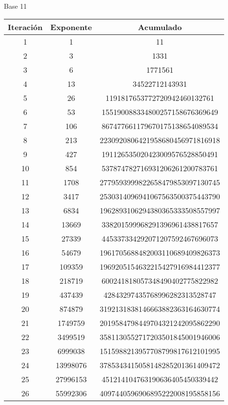 \documentclass[fleqn]{article}
\begin{document}
\begin{center}
        \newpage Base 11
        \begin{tabular}{c | c | c}
            Iteración & Exponente & Acumulado \\ \hline
            1 & 1 & 11 \\
            2 & 3 & 1331 \\
            3 & 6 & 1771561 \\
            4 & 13 & 34522712143931 \\
            5 & 26 & 1191817653772720942460132761 \\
            6 & 53 & 155190088334800257158676369649 \\
            7 & 106 & 867477661179670175138654089534 \\
            8 & 213 & 2230920806421958680456971816918 \\
            9 & 427 & 191126535020423009576528850491 \\
            10 & 854 & 537874782716931206261200783761 \\
            11 & 1708 & 2779593999822658479853097130745 \\
            12 & 3417 & 2530314096941067563500375443790 \\
            13 & 6834 & 1962893106294380365333508557997 \\
            14 & 13669 & 338201599968291396961438817657 \\
            15 & 27339 & 445337334292071207592467696073 \\
            16 & 54679 & 1961705688482003110689409826373 \\
            17 & 109359 & 1969205154632215427916984412377 \\
            18 & 218719 & 600241818057348490402775822982 \\
            19 & 437439 & 42843297435768996282313528747 \\
            20 & 874879 & 3192131838146663882363164630774 \\
            21 & 1749759 & 2019584798449704321242095862290 \\
            22 & 3499519 & 3581130552717203501845001946006 \\
            23 & 6999038 & 1515988213957708799817612101995 \\
            24 & 13998076 & 3785343415058148285201361409472 \\
            25 & 27996153 & 451214104763190636405450339442 \\
            26 & 55992306 & 4097440596906895222008195858156 \\

\end{tabular}
\end{center}
\end{document}
